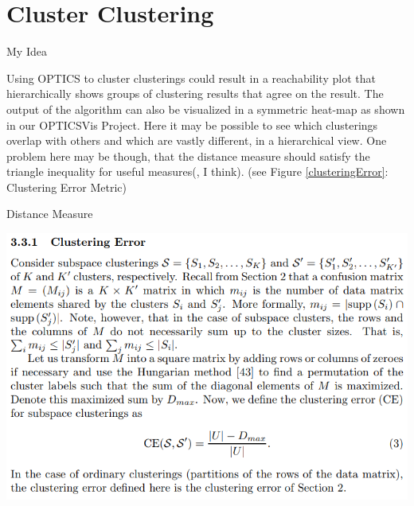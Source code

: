 \documentclass{beamer}
\begin{document}
\section{Cluster Clustering}

\begin{frame}{My Idea}

Using OPTICS to cluster clusterings could result in a reachability plot that hierarchically shows groups of clustering results that agree on the result. The output of the algorithm can also be visualized in a symmetric heat-map as shown in our OPTICSVis Project. Here it may be possible to see which clusterings overlap with others and which are vastly different, in a hierarchical view. One problem here may be though, that the distance measure should satisfy the triangle inequality for useful measures(, I think). (see Figure \ref{clusteringError}: Clustering Error Metric)

\end{frame}


\begin{frame}{Distance Measure}

\includegraphics[width=\textwidth]{ClusteringError}
\label{clusteringError}
\end{frame}




\end{document}
